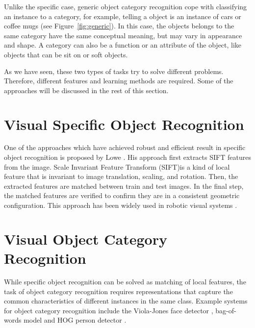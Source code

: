 \documentclass[12pt,final,twoside]{report}
\theoremstyle{plain}
\theoremstyle{definition}
\theoremstyle{remark}
\begin{document}

Unlike the specific case, generic object category recognition cope with classifying an instance to a category, for example, telling a object is an instance of cars or coffee mugs (see Figure~\ref{fig:generic}). In this case, the objects belongs to the same category have the same conceptual meaning, but may vary in appearance and shape. A category can also be a function or an attribute of the object, like objects that can be sit on or soft objects.

As we have seen, these two types of tasks try to solve different problems. Therefore, different features and learning methods are required. Some of the approaches will be discussed in the rest of this section.

\section{Visual Specific Object Recognition}
One of the approaches which have achieved robust and efficient result in specific object recognition is proposed by Lowe \cite{lowe_object_1999}. His approach first extracts SIFT features from the image. Scale Invariant Feature Transform (SIFT)is a kind of local feature that is invariant to image translation, scaling, and rotation. Then, the extracted features are matched between train and test images. In the final step, the matched features are verified to confirm they are in a consistent geometric configuration. This approach has been widely used in robotic visual systems \cite{grauman_visual_2011}.

\section{Visual Object Category Recognition}
While specific object recognition can be solved as matching of local features, the task of object category recognition requires representations that capture the common characteristics of different instances in the same class. Example systems for object category recognition include the Viola-Jones face detector \cite{viola_rapid_2001}, bag-of-words model \cite{csurka_visual_2004} and HOG person detector \cite{dalal_histograms_2005}. 
\end{document}
